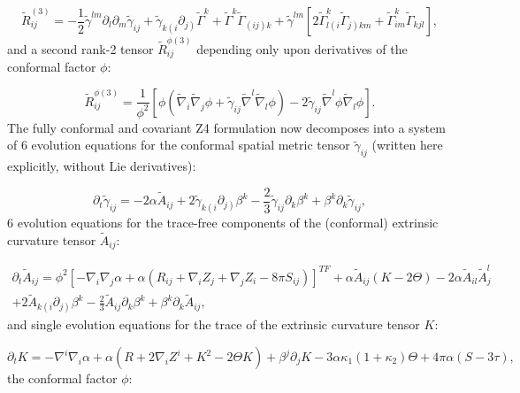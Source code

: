 \documentclass{article}
\begin{document}
\begin{equation}
\tilde{R}_{i j}^{\left( 3 \right)} = - \frac{1}{2} \tilde{\gamma}^{l m} \partial_l \partial_m \tilde{\gamma}_{i j} + \tilde{\gamma}_{k \left( i \right.} \partial_{\left. j \right)} \tilde{\Gamma}^k + \tilde{\Gamma}^k \tilde{\Gamma}_{\left( i j \right) k} + \tilde{\gamma}^{l m} \left[ 2 \tilde{\Gamma}_{l \left( i \right.}^{k} \tilde{\Gamma}_{\left. j \right) k m} + \tilde{\Gamma}_{i m}^{k} \tilde{\Gamma}_{k j l} \right],
\end{equation}
and a second rank-2 tensor ${\tilde{R}_{i j}^{\phi \left( 3 \right)}}$ depending only upon derivatives of the conformal factor ${\phi}$:

\begin{equation}
\tilde{R}_{i j}^{\phi \left( 3 \right)} = \frac{1}{\phi^2} \left[ \phi \left( \tilde{\nabla}_i \tilde{\nabla}_j \phi + \tilde{\gamma}_{i j} \tilde{\nabla}^{l} \tilde{\nabla}_l \phi \right) - 2 \tilde{\gamma}_{i j} \tilde{\nabla}^{l} \phi \tilde{\nabla}_{l} \phi \right].
\end{equation}
The fully conformal and covariant Z4 formulation now decomposes into a system of 6 evolution equations for the conformal spatial metric tensor ${\tilde{\gamma}_{i j}}$ (written here explicitly, without Lie derivatives):

\begin{equation}
\partial_t \tilde{\gamma}_{i j} = - 2 \alpha \tilde{A}_{i j} + 2 \tilde{\gamma}_{k \left( i \right.} \partial_{\left. j \right)} \beta^k - \frac{2}{3} \tilde{\gamma}_{i j} \partial_k \beta^k + \beta^k \partial_k \tilde{\gamma}_{i j},
\end{equation}
6 evolution equations for the trace-free components of the (conformal) extrinsic curvature tensor ${\tilde{A}_{i j}}$:

\begin{multline}
\partial_t \tilde{A}_{i j} = \phi^2 \left[ - \nabla_i \nabla_j \alpha + \alpha \left( R_{i j} + \nabla_i Z_j + \nabla_j Z_i - 8 \pi S_{i j} \right) \right]^{TF} + \alpha \tilde{A}_{i j} \left( K - 2 \Theta \right) - 2 \alpha \tilde{A}_{i l} \tilde{A}_{j}^{l}\\
+ 2 \tilde{A}_{k \left( i \right.} \partial_{\left. j \right)} \beta^k - \frac{2}{3} \tilde{A}_{i j} \partial_k \beta^k + \beta^k \partial_k \tilde{A}_{i j},
\end{multline}
and single evolution equations for the trace of the extrinsic curvature tensor $K$:

\begin{equation}
\partial_t K = - \nabla^i \nabla_i \alpha + \alpha \left( R + 2 \nabla_i Z^i + K^2 - 2 \Theta K \right) + \beta^j \partial_j K - 3 \alpha \kappa_1 \left( 1 + \kappa_2 \right) \Theta + 4 \pi \alpha \left( S - 3 \tau \right),
\end{equation}
the conformal factor ${\phi}$:
\end{document}
